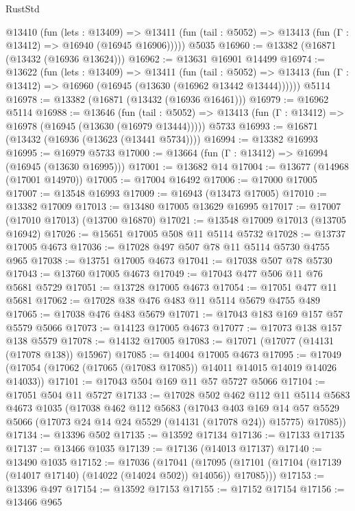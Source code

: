\begin{lexlean}{RustStd}
\begin{coremodule}
    @13410
      (fun (lets : @13409) =>
      @13411 (fun (tail : @5052) => @13413 (fun (Γ : @13412) => @16940 (@16945 @16906)))))
    @5035
@16960 := @13382 (@16871 (@13432 (@16936 @13624)))
@16962 := @13631 @16901 @14499
@16974 := @13622
    (fun (lets : @13409) =>
    @13411
      (fun (tail : @5052) =>
      @13413 (fun (Γ : @13412) => @16960 (@16945 (@13630 (@16962 @13442 @13444))))))
    @5114
@16978 := @13382 (@16871 (@13432 (@16936 @16461)))
@16979 := @16962 @5114
@16988 := @13646
    (fun (tail : @5052) => @13413 (fun (Γ : @13412) => @16978 (@16945 (@13630 (@16979 @13444)))))
    @5733
@16993 := @16871 (@13432 (@16936 (@13623 (@13441 @5734))))
@16994 := @13382 @16993
@16995 := @16979 @5733
@17000 := @13664 (fun (Γ : @13412) => @16994 (@16945 (@13630 @16995)))
@17001 := @13682 @14
@17004 := @13677 (@14968 (@17001 @14970))
@17005 := @17004 @16492
@17006 := @17000 @17005
@17007 := @13548 @16993
@17009 := @16943 (@13473 @17005)
@17010 := @13382 @17009
@17013 := @13480 @17005 @13629 @16995
@17017 := @17007 (@17010 @17013) (@13700 @16870)
@17021 := @13548 @17009 @17013 (@13705 @16942)
@17026 := @15651 @17005 @508 @11 @5114 @5732
@17028 := @13737 @17005 @4673
@17036 := @17028 @497 @507 @78 @11 @5114 @5730 @4755 @965
@17038 := @13751 @17005 @4673
@17041 := @17038 @507 @78 @5730
@17043 := @13760 @17005 @4673
@17049 := @17043 @477 @506 @11 @76 @5681 @5729
@17051 := @13728 @17005 @4673
@17054 := @17051 @477 @11 @5681
@17062 := @17028 @38 @476 @483 @11 @5114 @5679 @4755 @489
@17065 := @17038 @476 @483 @5679
@17071 := @17043 @183 @169 @157 @57 @5579 @5066
@17073 := @14123 @17005 @4673
@17077 := @17073 @138 @157 @138 @5579
@17078 := @14132 @17005
@17083 := @17071 (@17077 (@14131 (@17078 @138)) @15967)
@17085 := @14004 @17005 @4673
@17095 := @17049 (@17054 (@17062 (@17065 (@17083 @17085)) @14011 @14015 @14019 @14026 @14033))
@17101 := @17043 @504 @169 @11 @57 @5727 @5066
@17104 := @17051 @504 @11 @5727
@17133 := @17028
    @502
    @462
    @112
    @11
    @5114
    @5683
    @4673
    @1035
    (@17038
      @462
      @112
      @5683
      (@17043
        @403
        @169
        @14
        @57
        @5529
        @5066
        (@17073 @24 @14 @24 @5529 (@14131 (@17078 @24)) @15775)
        @17085))
@17134 := @13396 @502
@17135 := @13592 @17134
@17136 := @17133 @17135
@17137 := @13466 @1035
@17139 := @17136 (@14013 @17137)
@17140 := @13490 @1035
@17152 := @17036
    (@17041
      (@17095 (@17101 (@17104 (@17139 (@14017 @17140) (@14022 (@14024 @502)) @14056)) @17085)))
@17153 := @13396 @497
@17154 := @13592 @17153
@17155 := @17152 @17154
@17156 := @13466 @965

\end{coremodule}
\end{lexlean}
